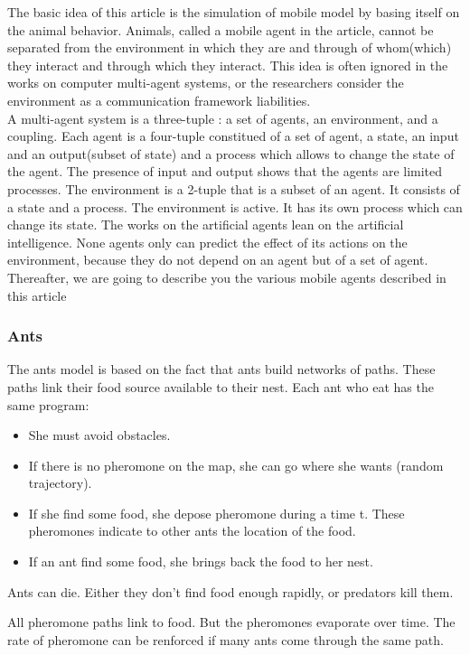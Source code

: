 The basic idea of this article is the simulation of mobile model by basing itself on the animal behavior.
Animals, called a mobile agent in the article, cannot be separated from the environment in which they are and through of whom(which) they interact and through which they interact. This idea is often ignored in the works on computer multi-agent systems, or the researchers consider the environment as a communication framework liabilities.\\
A multi-agent system is a three-tuple : a set of agents, an environment, and a coupling.
Each agent is a four-tuple constitued of a set of agent, a state, an input and an output(subset of state) and a process which allows to change the state of the agent. The presence of input and output shows that the agents are limited processes.
The environment is a 2-tuple that is a subset of an agent. It consists of a state and a process. The environment is active. It has its own process which can change its state. The works on the artificial agents lean on the artificial intelligence. None agents only can predict the effect of its actions on the environment, because they do not depend on an agent but of a set of agent.\\
Thereafter, we are going to describe you the various mobile agents described in this article

\newpage
\subsubsection{Ants}

The ants model is based on the fact that ants build networks of paths. These paths link their food source available to their nest.
Each ant who eat has the same program:

\begin{itemize}
\item She must avoid obstacles.
\item If there is no pheromone on the map, she can go where she wants (random trajectory).
\item If she find some food, she depose pheromone during a time t. These pheromones indicate to other ants the location of the food.
\item If an ant find some food, she brings back the food to her nest.\end{itemize}

Ants can die. Either they don't find food enough rapidly, or predators kill them.

All pheromone paths link to food. But the pheromones evaporate over time.  The rate of pheromone can be renforced if many ants come through the same path.

